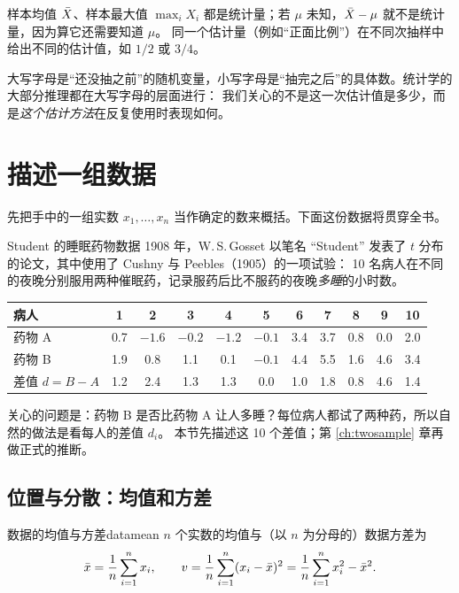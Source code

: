 样本均值 $\bar{X}$、样本最大值 $\max_i X_i$ 都是统计量；若 $\mu$ 未知，$\bar{X}-\mu$ 就不是统计量，因为算它还需要知道 $\mu$。
同一个估计量（例如“正面比例”）在不同次抽样中给出不同的估计值，如 $1/2$ 或 $3/4$。

\begin{intuition}
大写字母是“还没抽之前”的随机变量，小写字母是“抽完之后”的具体数。统计学的大部分推理都在大写字母的层面进行：
我们关心的不是这一次估计值是多少，而是\emph{这个估计方法}在反复使用时表现如何。
\end{intuition}

\section{描述一组数据}

先把手中的一组实数 $x_1,\dots,x_n$ 当作确定的数来概括。下面这份数据将贯穿全书。

\begin{casestudy}{Student 的睡眠药物数据}
1908 年，W.\,S.\,Gosset 以笔名 “Student” 发表了 $t$ 分布的论文，其中使用了 Cushny 与 Peebles（1905）的一项试验：
10 名病人在不同的夜晚分别服用两种催眠药，记录服药后比不服药的夜晚\emph{多睡}的小时数。
\begin{center}\small
\begin{tabular}{l*{10}{c}}
\toprule
病人 & 1 & 2 & 3 & 4 & 5 & 6 & 7 & 8 & 9 & 10\\
\midrule
药物 A & 0.7 & $-1.6$ & $-0.2$ & $-1.2$ & $-0.1$ & 3.4 & 3.7 & 0.8 & 0.0 & 2.0\\
药物 B & 1.9 & 0.8 & 1.1 & 0.1 & $-0.1$ & 4.4 & 5.5 & 1.6 & 4.6 & 3.4\\
\midrule
差值 $d=B-A$ & 1.2 & 2.4 & 1.3 & 1.3 & 0.0 & 1.0 & 1.8 & 0.8 & 4.6 & 1.4\\
\bottomrule
\end{tabular}
\end{center}
关心的问题是：药物 B 是否比药物 A 让人多睡？每位病人都试了两种药，所以自然的做法是看每人的差值 $d_i$。
本节先描述这 10 个差值；第 \ref{ch:twosample} 章再做正式的推断。
\end{casestudy}

\subsection{位置与分散：均值和方差}

\begin{definition}{数据的均值与方差}{datamean}
$n$ 个实数的均值与（以 $n$ 为分母的）数据方差为
\[
\bar{x}=\frac1n\sum_{i=1}^n x_i,\qquad v=\frac1n\sum_{i=1}^n(x_i-\bar{x})^2=\frac1n\sum_{i=1}^n x_i^2-\bar{x}^2 .
\]
\end{definition}

